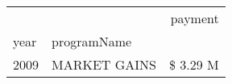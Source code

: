 \begin{tabular}{llr}
\toprule
 &  & payment \\
year & programName &  \\
\midrule
2009 & MARKET GAINS & \$ 3.29 M \\
\cline{1-3}
\bottomrule
\end{tabular}
